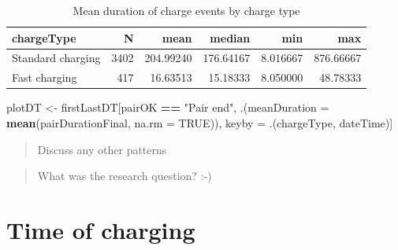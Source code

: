 \documentclass[]{article}
\newenvironment{Shaded}{\begin{snugshade}}{\end{snugshade}}
\newcommand{\KeywordTok}[1]{\textcolor[rgb]{0.13,0.29,0.53}{\textbf{#1}}}
\newcommand{\DataTypeTok}[1]{\textcolor[rgb]{0.13,0.29,0.53}{#1}}
\newcommand{\StringTok}[1]{\textcolor[rgb]{0.31,0.60,0.02}{#1}}
\newcommand{\OtherTok}[1]{\textcolor[rgb]{0.56,0.35,0.01}{#1}}
\newcommand{\OperatorTok}[1]{\textcolor[rgb]{0.81,0.36,0.00}{\textbf{#1}}}
\newcommand{\NormalTok}[1]{#1}
\begin{document}
\begin{table}[t]

\caption{\label{tab:meanDurationTable}Mean duration of charge events by charge type}
\centering
\begin{tabular}{l|r|r|r|r|r}
\hline
chargeType & N & mean & median & min & max\\
\hline
Standard charging & 3402 & 204.99240 & 176.64167 & 8.016667 & 876.66667\\
\hline
Fast charging & 417 & 16.63513 & 15.18333 & 8.050000 & 48.78333\\
\hline
\end{tabular}
\end{table}

\begin{Shaded}
\begin{Highlighting}[]
\NormalTok{plotDT <-}\StringTok{ }\NormalTok{firstLastDT[pairOK }\OperatorTok{==}\StringTok{ "Pair end"}\NormalTok{, .(}\DataTypeTok{meanDuration =} \KeywordTok{mean}\NormalTok{(pairDurationFinal, }\DataTypeTok{na.rm =} \OtherTok{TRUE}\NormalTok{)), keyby =}\StringTok{ }\NormalTok{.(chargeType, dateTime)]}
\end{Highlighting}
\end{Shaded}

\begin{quote}
Discuss any other patterns
\end{quote}

\begin{quote}
What was the research question? :-)
\end{quote}

\section{Time of charging}\label{time-of-charging}
\end{document}
